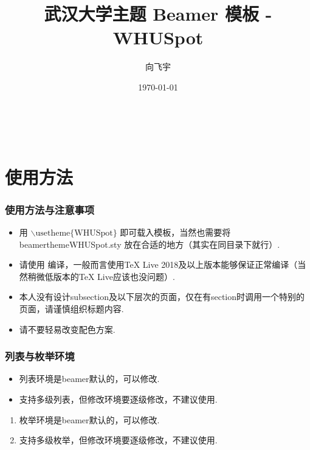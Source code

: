 \documentclass{beamer}
\title{武汉大学主题 Beamer 模板 - WHUSpot}
\author{向飞宇}
\institute{武汉大学}
\date{\today}
\begin{document}
\begin{frame}
    \frametitle{\\}
    \titlepage
\end{frame}

\section{使用方法}

\begin{frame}
    \frametitle{使用方法与注意事项}
    \begin{itemize}
        \item 用 $\backslash \mbox{usetheme\{WHUSpot\}}$ 即可载入模板，当然也需要将 beamerthemeWHUSpot.sty 放在合适的地方（其实在同目录下就行）.
        \item 请使用  编译，一般而言使用\alert{TeX Live 2018}及以上版本能够保证正常编译（当然稍微低版本的TeX Live应该也没问题）.
        \item 本人\alert{没有设计subsection及以下层次}的页面，仅在有section时调用一个特别的页面，请谨慎组织标题内容.
        \item 请不要轻易改变配色方案.
    \end{itemize}
\end{frame}

\begin{frame}
    \frametitle{列表与枚举环境}
    \begin{itemize}
        \item 列表环境是beamer默认的，可以修改. \pause
        \item 支持多级列表，但修改环境要逐级修改，\alert{不建议}使用. \pause
    \end{itemize}

    \begin{enumerate}
        \item 枚举环境是beamer默认的，可以修改. \pause
        \item 支持多级枚举，但修改环境要逐级修改，\alert{不建议}使用.
    \end{enumerate}
\end{frame}
\end{document}
